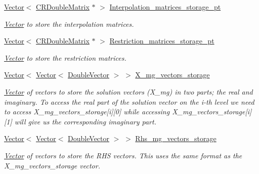 \begin{DoxyCompactItemize}
\hyperlink{classoomph_1_1Vector}{Vector}$<$ \hyperlink{classoomph_1_1CRDoubleMatrix}{C\+R\+Double\+Matrix} $\ast$ $>$ \hyperlink{classoomph_1_1HelmholtzMGPreconditioner_a661811aae02c456b338964cb5e918e70}{Interpolation\+\_\+matrices\+\_\+storage\+\_\+pt}
\begin{DoxyCompactList}\small\item\em \hyperlink{classoomph_1_1Vector}{Vector} to store the interpolation matrices. \end{DoxyCompactList}\item 
\hyperlink{classoomph_1_1Vector}{Vector}$<$ \hyperlink{classoomph_1_1CRDoubleMatrix}{C\+R\+Double\+Matrix} $\ast$ $>$ \hyperlink{classoomph_1_1HelmholtzMGPreconditioner_a4a268a461998cabc0b65e256ee6a039f}{Restriction\+\_\+matrices\+\_\+storage\+\_\+pt}
\begin{DoxyCompactList}\small\item\em \hyperlink{classoomph_1_1Vector}{Vector} to store the restriction matrices. \end{DoxyCompactList}\item 
\hyperlink{classoomph_1_1Vector}{Vector}$<$ \hyperlink{classoomph_1_1Vector}{Vector}$<$ \hyperlink{classoomph_1_1DoubleVector}{Double\+Vector} $>$ $>$ \hyperlink{classoomph_1_1HelmholtzMGPreconditioner_a636cb6f321d27cb892d61d7cdddd9338}{X\+\_\+mg\+\_\+vectors\+\_\+storage}
\begin{DoxyCompactList}\small\item\em \hyperlink{classoomph_1_1Vector}{Vector} of vectors to store the solution vectors (X\+\_\+mg) in two parts; the real and imaginary. To access the real part of the solution vector on the i-\/th level we need to access X\+\_\+mg\+\_\+vectors\+\_\+storage\mbox{[}i\mbox{]}\mbox{[}0\mbox{]} while accessing X\+\_\+mg\+\_\+vectors\+\_\+storage\mbox{[}i\mbox{]}\mbox{[}1\mbox{]} will give us the corresponding imaginary part. \end{DoxyCompactList}\item 
\hyperlink{classoomph_1_1Vector}{Vector}$<$ \hyperlink{classoomph_1_1Vector}{Vector}$<$ \hyperlink{classoomph_1_1DoubleVector}{Double\+Vector} $>$ $>$ \hyperlink{classoomph_1_1HelmholtzMGPreconditioner_afcd8e10b971adcb3e68eacefd876e833}{Rhs\+\_\+mg\+\_\+vectors\+\_\+storage}
\begin{DoxyCompactList}\small\item\em \hyperlink{classoomph_1_1Vector}{Vector} of vectors to store the R\+HS vectors. This uses the same format as the X\+\_\+mg\+\_\+vectors\+\_\+storage vector. \end{DoxyCompactList}\item 

\end{DoxyCompactItemize}
